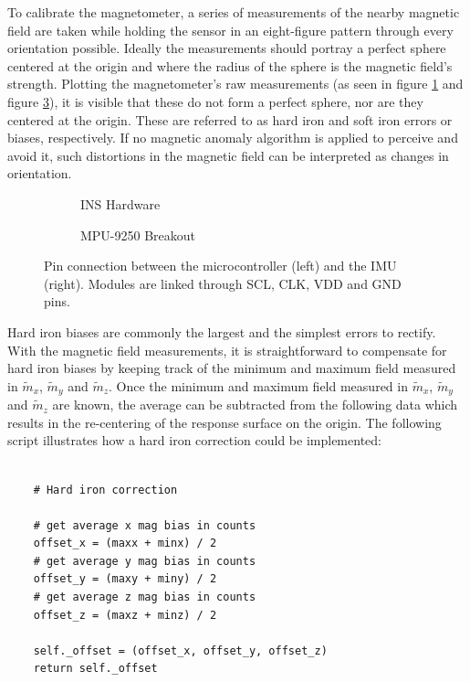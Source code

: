 To calibrate the magnetometer, a series of measurements of the nearby magnetic field are taken while holding the sensor in an eight-figure pattern through every orientation possible. Ideally the measurements should portray a perfect sphere centered at the origin and where the radius of the sphere is the magnetic field's strength. Plotting the magnetometer's raw measurements (as seen in figure \ref{plt:raw_magnetometer} and figure \ref{plt:raw_magnetometer3D}), it is visible that these do not form a perfect sphere, nor are they centered at the origin. These are referred to as hard iron and soft iron errors or biases, respectively. If no magnetic anomaly algorithm is applied to perceive and avoid it, such distortions in the magnetic field can be interpreted as changes in orientation.

\begin{figure}[!h]
    \centering
    \begin{subfigure}{0.7\textwidth}
        \centering
        \resizebox{1\linewidth}{!}{}
        \caption{INS Hardware}
        \label{plt:raw_magnetometer}
    \end{subfigure}

    \begin{subfigure}{0.7\textwidth}
        \centering
        \resizebox{1\linewidth}{!}{}
        \caption{MPU-9250 Breakout}
        \label{plt:raw_magnetometer3D}
    \end{subfigure}
    \caption{Pin connection between the microcontroller (left) and the IMU (right). Modules are linked through SCL, CLK, VDD and GND pins.}
\end{figure}

Hard iron biases are commonly the largest and the simplest errors to rectify. With the magnetic field measurements, it is straightforward to compensate for hard iron biases by keeping track of the minimum and maximum field measured in $\widetilde{m}_x$, $\widetilde{m}_y$ and $\widetilde{m}_z$. Once the minimum and maximum field measured in $\widetilde{m}_x$, $\widetilde{m}_y$ and $\widetilde{m}_z$ are known, the average can be subtracted from the following data which results in the re-centering of the response surface on the origin. The following script illustrates how a hard iron correction could be implemented:

\lstset{language=Python}
\begin{lstlisting}[frame=single]  % Start your code-block

    # Hard iron correction

    # get average x mag bias in counts
    offset_x = (maxx + minx) / 2
    # get average y mag bias in counts
    offset_y = (maxy + miny) / 2
    # get average z mag bias in counts
    offset_z = (maxz + minz) / 2

    self._offset = (offset_x, offset_y, offset_z)
    return self._offset
\end{lstlisting}


